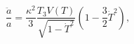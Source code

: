 \begin{equation}\label{Eeq2}
\frac{\ddot a}{a}=\frac{\kappa^2}{3}\frac{T_{3}V(T)}{\sqrt{1-\dot{T}^{2}}}
\left(1-\frac{3}{2}\dot{T}^{2}\right),
\end{equation}

